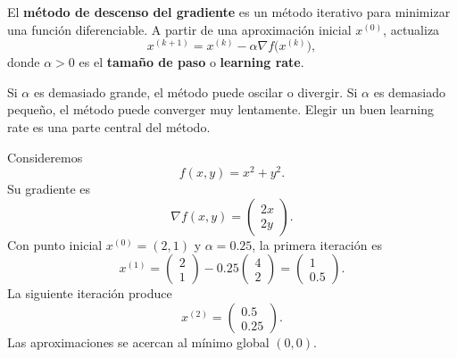 \documentclass[a4,11pt]{aleph-notas}
\begin{document}
\begin{defi}
    El \textbf{método de descenso del gradiente} es un método iterativo para minimizar una función diferenciable. A partir de una aproximación inicial ${x}^{(0)}$, actualiza
    \[
        {x}^{(k+1)}
        =
        {x}^{(k)}
        -
        \alpha \nabla f\bigl({x}^{(k)}\bigr),
    \]
    donde $\alpha>0$ es el \textbf{tamaño de paso} o \textbf{learning rate}.
\end{defi}

\begin{pscodigo}
\begin{function}[H]
\end{function}
\end{pscodigo}

\begin{advertencia}
    Si $\alpha$ es demasiado grande, el método puede oscilar o divergir. Si $\alpha$ es demasiado pequeño, el método puede converger muy lentamente. Elegir un buen learning rate es una parte central del método.
\end{advertencia}

\begin{ejem}
    Consideremos
    \[
        f(x,y)=x^2+y^2.
    \]
    Su gradiente es
    \[
        \nabla f(x,y)=
        \begin{pmatrix}
            2x\\
            2y
        \end{pmatrix}.
    \]
    Con punto inicial ${x}^{(0)}=(2,1)$ y $\alpha=0.25$, la primera iteración es
    \[
        {x}^{(1)}
        =
        \begin{pmatrix}
            2\\
            1
        \end{pmatrix}
        -
        0.25
        \begin{pmatrix}
            4\\
            2
        \end{pmatrix}
        =
        \begin{pmatrix}
            1\\
            0.5
        \end{pmatrix}.
    \]
    La siguiente iteración produce
    \[
        {x}^{(2)}
        =
        \begin{pmatrix}
            0.5\\
            0.25
        \end{pmatrix}.
    \]
    Las aproximaciones se acercan al mínimo global $(0,0)$.
\end{ejem}
\end{document}
